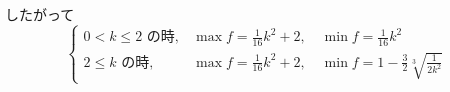 \documentclass[../main.tex]{subfiles}
\begin{document}
したがって
\[
  \begin{cases}
    0 < k \le 2 \text{ の時}, & \max f = \frac{1}{16}k^2 + 2, \quad \min f = \frac{1}{16}k^2 \\[6pt]
    2 \le k \text{ の時}, & \max f = \frac{1}{16}k^2 + 2, \quad \min f = 1 - \frac{3}{2}\sqrt[3]{\frac{1}{2k^2}}
  \end{cases}
\]
\end{document}

